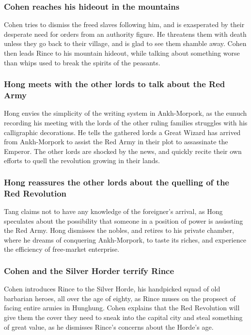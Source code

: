 \subsubsection{\Gls{Cohen} reaches his hideout in the mountains}
\Gls{Cohen} tries to dismiss the freed slaves following him, and is exasperated by their desperate
need for orders from an authority figure. He threatens them with death unless they go back to their
village, and is glad to see them shamble away. \Gls{Cohen} then leads \Gls{Rince} to his mountain
hideout, while talking about something worse than whips used to break the spirits of the peasants.

\subsubsection{\Gls{Hong} meets with the other lords to talk about the Red Army}
\Gls{Hong} envies the simplicity of the writing system in Ankh-Morpork, as the eunuch recording his
meeting with the lords of the other ruling families struggles with his calligraphic decorations.
He tells the gathered lords a Great Wizard has arrived from Ankh-Morpork to assist the Red Army in
their plot to assassinate the Emperor. The other lords are shocked by the news, and quickly recite
their own efforts to quell the revolution growing in their lands.

\subsubsection{\Gls{Hong} reassures the other lords about the quelling of the Red Revolution}
\Gls{Tang} claims not to have any knowledge of the foreigner's arrival, as \Gls{Hong} speculates
about the possibility that someone in a position of power is assissting the Red Army. \Gls{Hong}
dismisses the nobles, and retires to his private chamber, where he dreams of conquering
Ankh-Morpork, to taste its riches, and experience the efficiency of free-market enterprise.

\subsubsection{\Gls{Cohen} and the Silver Horder terrify \Gls{Rince}}
\Gls{Cohen} introduces \Gls{Rince} to the Silver Horde, his handpicked squad of old barbarian
heroes, all over the age of eighty, as \Gls{Rince} muses on the propsect of facing entire armies in
Hunghung. \Gls{Cohen} explains that the Red Revolution will give them the cover they need to sneak
into the capital city and steal something of great value, as he dismisses \Gls{Rince}'s concerns
about the Horde's age.

